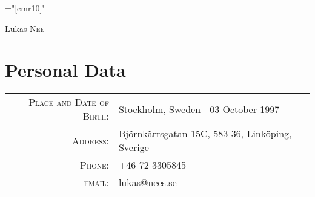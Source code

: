 \documentclass[a4paper,10pt]{article}
\begin{document}

\pagestyle{empty} %

\font\fb="[cmr10]" %

\par{\centering
		{\Huge Lukas \textsc{Nee}
	}\bigskip\par}

\section{Personal Data}

\begin{tabular}{rl}
    \textsc{Place and Date of Birth:} & Stockholm, Sweden  | 03 October 1997 \\
    \textsc{Address:}   & Björnkärrsgatan 15C, 583 36, Linköping, Sverige \\
    \textsc{Phone:}     & +46 72 3305845\\
    \textsc{email:}     & \href{mailto:lukas@nees.se}{lukas@nees.se}
\end{tabular}

\end{document}
